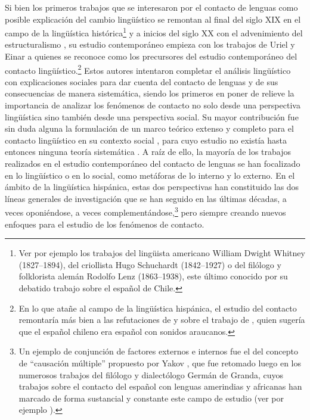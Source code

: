 \documentclass[output=paper]{langscibook}
\begin{document}
Si bien los primeros trabajos que se interesaron por el contacto de lenguas como posible explicación del cambio lingüístico se remontan al final del siglo XIX en el campo de la lingüística histórica\footnote{Ver por ejemplo los trabajos del lingüista americano William Dwight Whitney (1827--1894), del criollista Hugo Schuchardt (1842--1927) o del filólogo y folklorista alemán Rodolfo Lenz (1863--1938), este último conocido por su debatido trabajo sobre el español de Chile.} y a inicios del siglo XX con el advenimiento del estructuralismo \citep{Winford2003book}, su estudio contemporáneo empieza con los trabajos de Uriel \citet{Weinreich1953} y Einar \citet{Haugen1950a,Haugen1950b,Haugen1953} a quienes se reconoce como los precursores del estudio contemporáneo del contacto lingüístico.\footnote{En lo que atañe al campo de la lingüística hispánica, el estudio del contacto remontaría más bien a las refutaciones de \citet{Alonso1953} y \citet{Oroz1966} sobre el trabajo de \citet{Lenz1893}, quien sugería que el español chileno era español con sonidos araucanos.} Estos autores intentaron completar el análisis lingüístico con explicaciones sociales para dar cuenta del contacto de lenguas y de sus consecuencias de manera sistemática, siendo los primeros en poner de relieve la importancia de analizar los fenómenos de contacto no solo desde una perspectiva lingüística sino también desde una perspectiva social. Su mayor contribución fue sin duda alguna la formulación de un marco teórico extenso y completo para el contacto lingüístico en su contexto social \citep{Winford2003book}, para cuyo estudio no existía hasta entonces ninguna teoría sistemática \citep[456]{Clyne1987}. A raíz de ello, la mayoría de los trabajos realizados en el estudio contemporáneo del contacto de lenguas se han focalizado en lo lingüístico o en lo social, como metáforas de lo interno y lo externo. En el ámbito de la lingüística hispánica, estas dos perspectivas han constituido las dos líneas generales de investigación que se han seguido en las últimas décadas, a veces oponiéndose, a veces complementándose,\footnote{Un ejemplo de conjunción de factores externos e internos fue el del concepto de “causación múltiple” propuesto por Yakov \citet{Malkiel1967}, que fue retomado luego en los numerosos trabajos del filólogo y dialectólogo Germán de Granda, cuyos trabajos sobre el contacto del español con lenguas amerindias y africanas han marcado de forma sustancial y constante este campo de estudio (ver por ejemplo \citealt{DeGranda1991,DeGranda1994,DeGranda1999,DeGranda2001}).} pero siempre creando nuevos enfoques para el estudio de los fenómenos de contacto.
\end{document}
